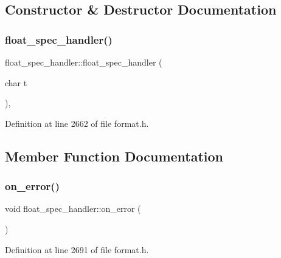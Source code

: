 \subsection{Constructor \& Destructor Documentation}
\mbox{\label{structfloat__spec__handler_aa36cb1bcbe552cb7963783f813dffbdf}} 
\subsubsection{\texorpdfstring{float\+\_\+spec\+\_\+handler()}{float\_spec\_handler()}}
{\footnotesize\ttfamily float\+\_\+spec\+\_\+handler\+::float\+\_\+spec\+\_\+handler (\begin{DoxyParamCaption}\item[{char}]{t }\end{DoxyParamCaption})\hspace{0.3cm}{\ttfamily [inline]}, {\ttfamily [explicit]}}



Definition at line 2662 of file format.\+h.



\subsection{Member Function Documentation}
\mbox{\label{structfloat__spec__handler_ae7ee9d59f1624b0cc52fe767a5ef96bf}} 
\subsubsection{\texorpdfstring{on\+\_\+error()}{on\_error()}}
{\footnotesize\ttfamily void float\+\_\+spec\+\_\+handler\+::on\+\_\+error (\begin{DoxyParamCaption}{ }\end{DoxyParamCaption})\hspace{0.3cm}{\ttfamily [inline]}}



Definition at line 2691 of file format.\+h.

